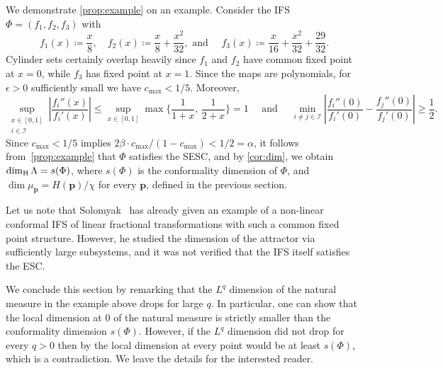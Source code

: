 \documentclass[11pt,a4paper]{article}
\def\cref#1{\ref{#1}}%
\theoremstyle{definition}
\theoremstyle{remark}
\newcommand{\0}{\mathbf{0}}
\numberwithin{equation}{section}
\begin{document}
We demonstrate \cref{prop:example} on an example. Consider the IFS $\Phi=(f_1,f_2,f_3)$ with
\begin{equation*}%
f_1(x)\coloneqq \frac{x}{8}, \quad f_2(x)\coloneqq \frac{x}{8} + \frac{x^2}{32}, \text{ and } \quad
f_3(x)\coloneqq \frac{x}{16} + \frac{x^2}{32} + \frac{29}{32}. 
\end{equation*}
Cylinder sets certainly overlap heavily since $f_1$ and $f_2$ have common fixed point at $x=0$,
while $f_3$ has fixed point at $x=1$. Since the maps are polynomials, for $\epsilon>0$
sufficiently small we have $c_{\max}<1/5$. Moreover,
\begin{equation*}
\sup_{\substack{x\in[0,1] \\ i\in\mathcal{I}}} \left| \frac{f_i''(x)}{f_i'(x)} \right| \leq
\sup_{x\in[0,1]} \max\Big\{\frac{1}{1+x},\, \frac{1}{2+x} \Big\} = 1 \quad\text{ and }\quad
\min_{i\neq j\in\mathcal{I}}\left| \frac{f_i''(0)}{f_i'(0)} - \frac{f_j''(0)}{f_j'(0)} \right| \geq
\frac{1}{2} .
\end{equation*}
Since $c_{\max}<1/5$ implies $2\beta\cdot c_{\max}/(1-c_{\max})<1/2=\alpha$, it follows from~\cref{prop:example} that $\Phi$ satisfies the
SESC, and by \cref{cor:dim}, we obtain $\dim_{\rm H}\Lambda=s(\Phi)$, where $s(\Phi)$ is the
conformality dimension of $\Phi$, and $\dim \mu_{\mathbf{p}} =  H(\mathbf{p})/\chi$ for
every $\mathbf{p}$, defined in the previous section. 

Let us note that Solomyak~\cite{Solomyak24} has already given an example of a non-linear conformal
IFS of linear fractional transformations with such a common fixed point structure.
However, he studied the dimension of the attractor via sufficiently large subsystems, and it was not
verified that the IFS itself satisfies the ESC.

We conclude this section by remarking that the $L^q$ dimension of the natural measure in the example
above drops for large $q$. In particular, one can show that the local dimension at $0$ of the
natural measure is strictly smaller than the conformality dimension $s(\Phi)$. However, if the $L^q$
dimension did not drop for every $q>0$ then by \cite[Lemma~1.7]{Shmerkin_LqSelfSim_Annals} the local
dimension at every point would be at least $s(\Phi)$, which is a contradiction. We leave the details
for the interested reader.

\end{document}
